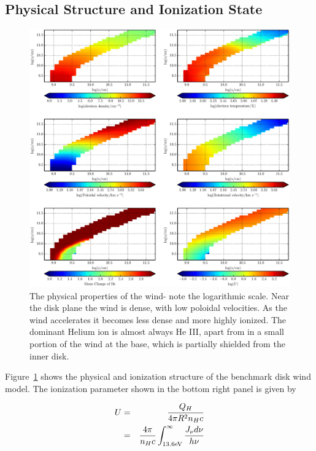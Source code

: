 \documentclass[preprint, a4paper, 11pt]{aastex}
\begin{document}
\subsection{Physical Structure and Ionization State}
\label{modela_ionization}

\begin{figure} %
\includegraphics[width=\textwidth]{figures/fig5.eps}
\caption{
The physical properties of the wind- note the logarithmic scale. 
Near the disk plane the wind is dense, with low poloidal velocities.
As the wind accelerates it becomes less dense
and more highly ionized. The dominant Helium ion
is almost always He III, apart from in a small
portion of the wind at the base, which is partially shielded
from the inner disk.
}
\label{wind}
\end{figure} %

Figure~\ref{wind} shows the physical and ionization structure 
of the benchmark disk wind model. The ionization parameter shown in the bottom
right panel is given by

\begin{eqnarray}
U&=&\frac{Q_H}{4\pi R^2 n_{H} c}\\ 
  &=& \frac{4\pi}{n_H c}\int_{13.6{\rm{eV}}}^{\infty}\frac{{J_{\nu}d\nu}}{h\nu}
\end{eqnarray}
 
\end{document}
